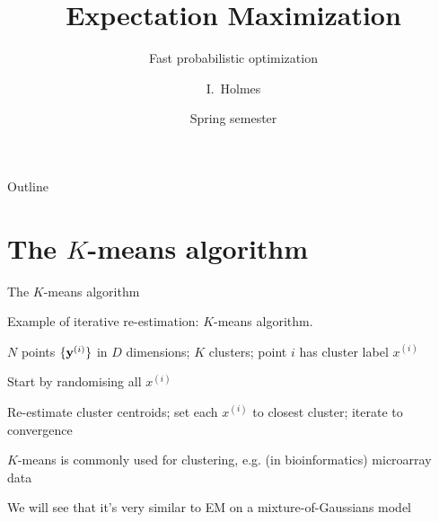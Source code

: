 \documentclass{beamer}
\title[EM] %
{Expectation Maximization}
\subtitle
{Fast probabilistic optimization} %
\author%
{I.~Holmes} %
\institute[University of California, Berkeley] %
{
  Department of Bioengineering\\
  University of California, Berkeley}
\date%
{Spring semester}
\begin{document}
\begin{frame}
  \titlepage
\end{frame}

\begin{frame}{Outline}
  \tableofcontents
\end{frame}

\section{The $K$-means algorithm}

\begin{frame}{The $K$-means algorithm}


 Example of iterative re-estimation: $K$-means algorithm.
 \itemb
 \item $N$ points $\{{\bf y}^{(i)}\}$ in $D$ dimensions; $K$ clusters; point $i$ has cluster label $x^{(i)}$
 \item Start by randomising all $x^{(i)}$
 \item Re-estimate cluster centroids; set each $x^{(i)}$ to closest cluster; iterate to convergence
 \item $K$-means is commonly used for clustering, e.g. (in bioinformatics) microarray data
 \item We will see that it's very similar to EM on a mixture-of-Gaussians model
 \iteme

\end{frame}
\end{document}
